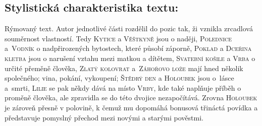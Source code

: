 \documentclass{extarticle} %
\begin{document}
\subsection*{Stylistická charakteristika textu:}
\noindent 
Rýmovaný text. Autor jednotlivé části rozdělil do pozic tak, ži vznikla zrcadlová souměrnost vlastností. Tedy \textsc{Kytice} a \textsc{Věštkyně} jsou o naději, \textsc{Polednice} a~\textsc{Vodník} o nadpřirozených bytostech, které působí záporně, \textsc{Poklad} a \textsc{Dceřina kletba} jsou o narušení vztahu mezi matkou a dítětem, \textsc{Svatební košile} a \textsc{Vrba} o určité přeměně člověka, \textsc{Zlatý kolovrat} a~\textsc{Záhořovo lože} mají hned několik společného; vina, pokání, vykoupení; \textsc{Štědrý den} a \textsc{Holoubek} jsou o~lásce a~smrti, \textsc{Lilie} se pak někdy dává na místo \textsc{Vrby}, kde také naplňuje příběh o proměně člověka, ale zpravidla se do této dvojice nezapočítává. Zrovna \textsc{Holoubek} je zároveň přesně v polovině, k čemuž mu dopomáhá bonusová třináctá povídka a představuje pomyslný přechod mezi novými a starými pověstmi.

\end{document}

